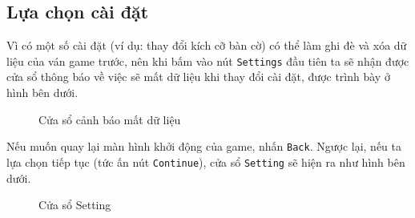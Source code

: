 \subsection{Lựa chọn cài đặt}
Vì có một số cài đặt (ví dụ: thay đổi kích cỡ bàn cờ) có thể làm ghi đè và xóa dữ liệu của ván game trước, nên khi bấm vào nút \verb|Settings| đầu tiên ta sẽ nhận được cửa sổ thông báo về việc sẽ mất dữ liệu khi thay đổi cài đặt, được trình bày ở hình bên dưới.
\begin{figure}[H]
\caption{Cửa sổ cảnh báo mất dữ liệu}
\end{figure}

Nếu muốn quay lại màn hình khởi động của game, nhấn \verb|Back|. Ngược lại, nếu ta lựa chọn tiếp tục (tức ấn nút \verb|Continue|), cửa sổ \verb|Setting| sẽ hiện ra như hình bên dưới.
\begin{figure}[H]
\caption{Cửa sổ Setting}
\end{figure}

